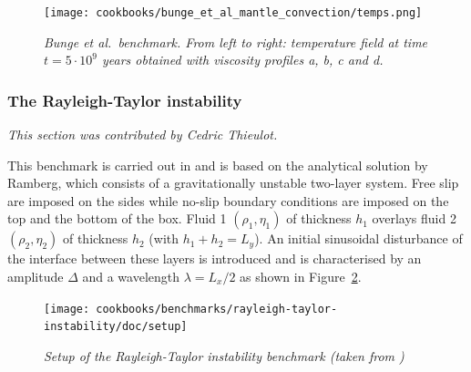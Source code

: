 \documentclass{article}
\begin{document}
\begin{figure}[tbp]
  \centering
  \texttt{[image: cookbooks/bunge\_et\_al\_mantle\_convection/temps.png]}
  \caption{\it Bunge et al.~benchmark. From left to right: temperature field at time $t=5\cdot 10^9$ years obtained with viscosity profiles a, b, c and d.}
  \label{fig:bunge_et_al}
\end{figure}


\subsubsection{The Rayleigh-Taylor instability}
\label{sec:benchmark-rayleigh-taylor}

\textit{This section was contributed by Cedric Thieulot.}

This benchmark is carried out in \cite{Deu08,Ger10,thie11} and is
based on the analytical solution by Ramberg\cite{ramb68},
which  consists of a gravitationally unstable two-layer system.
Free slip are imposed on the sides while no-slip boundary conditions are imposed on the
top and the bottom of the box.
Fluid 1 $(\rho_1,\eta_1)$ of thickness $h_1$ overlays
fluid 2 $(\rho_2,\eta_2)$ of thickness $h_2$ (with $h_1+h_2=L_y$).
An initial sinusoidal disturbance of the interface between these
layers is introduced and is characterised by an amplitude $\Delta$ and a
wavelength $\lambda=L_x/2$ as shown in Figure~\ref{fig:RTi_setup}.

\begin{figure}
  \centering
  \texttt{[image: cookbooks/benchmarks/rayleigh-taylor-instability/doc/setup]}
  \caption{\it Setup of the Rayleigh-Taylor instability benchmark (taken from \cite{thie11})}
  \label{fig:RTi_setup}
\end{figure}
\end{document}
